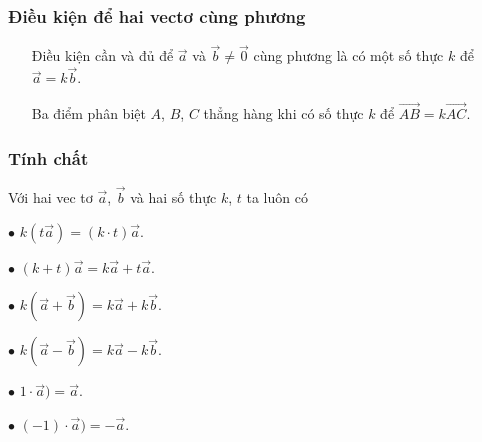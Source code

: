 \subsubsection{Điều kiện để hai vectơ cùng phương}
 \begin{gachsoc}
 	\begin{itemize}
 		\item [\ding{172}] Điều kiện cần và đủ để $\overrightarrow{a}$ và $\overrightarrow{b} \ne \overrightarrow{0}$ cùng phương là có một số thực $k$ để $\overrightarrow{a}=k\overrightarrow{b}$.
 		\item [\ding{173}] Ba điểm phân biệt $A$, $B$, $C$ thẳng hàng khi có số thực $k$ để $\overrightarrow{AB}=k\overrightarrow{AC}$.
 	\end{itemize}
 \end{gachsoc}
\subsubsection{Tính chất}
\begin{tcolorbox}[colframe=orange,colback=white,boxrule=0.2mm]
	Với hai vec tơ $\vec{a}$, $\vec{b}$ và hai số thực $k$, $t$ ta luôn có
	\begin{listEX}[3]
		\item [$\bullet$] $k(t\vec{a})=(k \cdot t)\vec{a}$.
		\item [$\bullet$] $(k+t)\vec{a}=k\vec{a}+t\vec{a}$.
		\item [$\bullet$] $k(\vec{a}+\vec{b})=k\vec{a}+k\vec{b}$.
		\item [$\bullet$] $k(\vec{a}-\vec{b})=k\vec{a}-k\vec{b}$.
		\item [$\bullet$] $1\cdot \vec{a})=\vec{a}$. 
		\item [$\bullet$] $(-1)\cdot \vec{a})=-\vec{a}$.
	\end{listEX}
\end{tcolorbox}
